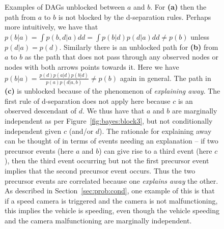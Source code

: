 \begin{figure}[t]
	\centering 
	\hspace{-15pt}
	\begin{subfigure}[t]{0.32\textwidth}
		\centering
		\resizebox{0.9\textwidth}{!}{
		}
		\caption{\label{fig:bayes:unblock1}}
	\end{subfigure}
	\begin{subfigure}[t]{0.32\textwidth}
		\centering
		\resizebox{0.9\textwidth}{!}{
		}
		\caption{\label{fig:bayes:unblock2}}
	\end{subfigure}
	\begin{subfigure}[t]{0.32\textwidth}
		\centering
		\resizebox{1.1\textwidth}{!}{
		}
		\caption{\label{fig:bayes:unblock3}}
	\end{subfigure}
	\caption{Examples of DAGs unblocked between $a$ and $b$. For \textbf{(a)} then the path from $a$ to
		$b$ is not blocked by the d-separation rules.  Perhaps more intuitively, we have that
		$p(b|a) = \int p(b,d|a) dd = \int p(b|d)p(d|a) dd \neq p(b)$ unless $p(d|a)=p(d)$.
		Similarly there is an unblocked path for \textbf{(b)} from $a$ to $b$ as the path
		that does not pass through any observed nodes or nodes with both arrows points towards it.
		Here we have $p(b|a) = \frac{p(d)p(a|d)p(b|d)}{p(a)p(d|a,b)} \neq p(b)$ again in general.
		The path in \textbf{(c)} is unblocked because of the phenomenon of \emph{explaining away}.
		The first rule of d-separation does not apply here because $c$ is an observed descendant of
		$d$.  We thus have that $a$ and $b$ are marginally independent as per Figure~\ref{fig:bayes:block3},
		but not conditionally independent given $c$ (and/or $d$). The rationale for explaining away can be thought
		of in terms of events needing an explanation -- if two precursor events (here $a$ and $b$) can give rise 
		to a third event (here $c$), then
		the third event occurring but not the first precursor event implies that the second precursor
		event occurs.  Thus the two precursor events are correlated because one \emph{explains away} the other.
		As described in Section~\ref{sec:prob:cond}, one example of this is that if a speed camera is
		triggered and the camera is not malfunctioning, this implies the vehicle is speeding, even though
		the vehicle speeding and the camera malfunctioning are marginally independent.	
		\label{fig:bayes:unblocked-graphs}}
\end{figure}


